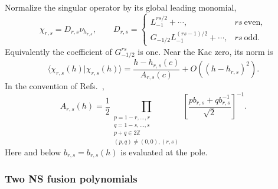 \documentclass[11pt]{article}
\begin{document}
Normalize the singular operator by its global leading monomial,
\begin{equation}
 \chi_{r,s}=D_{r,s}\nu_{h_{r,s}},
 \qquad
 D_{r,s}=
 \begin{cases}
  L_{-1}^{rs/2}+\cdots,&rs\ \text{even},\\
  G_{-1/2}L_{-1}^{(rs-1)/2}+\cdots,&rs\ \text{odd}.
 \end{cases}
 \label{eq:null-normalization}
\end{equation}
Equivalently the coefficient of \(G_{-1/2}^{rs}\) is one.  Near the Kac
zero, its norm is
\begin{equation}
 \langle\chi_{r,s}(h)|\chi_{r,s}(h)\rangle
 =\frac{h-h_{r,s}(c)}{A_{r,s}(c)}
  +O((h-h_{r,s})^2).
 \label{eq:null-slope}
\end{equation}
In the convention of
Refs.~\cite{HadaszJaskolskiSuchanek2007NSBlocks,
BelavinGeiko2018CRecursion},
\begin{equation}
 A_{r,s}(h)
 =\frac12
 \prod_{\substack{
 p=1-r,\ldots,r\\
 q=1-s,\ldots,s\\
 p+q\in2\mathbb Z\\
 (p,q)\ne(0,0),(r,s)}}
 \left[
  \frac{p b_{r,s}+q b_{r,s}^{-1}}{\sqrt2}
 \right]^{-1}.
 \label{eq:null-a-factor}
\end{equation}
Here and below \(b_{r,s}=b_{r,s}(h)\) is evaluated at the pole.

\subsubsection{Two NS fusion polynomials}
\end{document}
